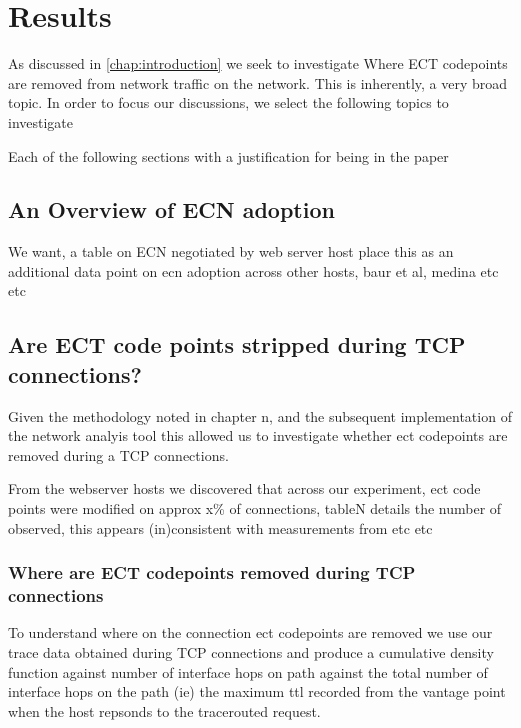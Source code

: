 \documentclass{l4proj}
\begin{document}
\chapter{Results} 

As discussed in \autoref{chap:introduction} we seek to investigate Where ECT codepoints are removed from network traffic on the network. This is inherently, a very broad topic. In order to focus our discussions, we select the following topics to investigate

{{Each of the following sections with a justification for being in the paper}}

\section{An Overview of ECN adoption}

We want, a table on ECN negotiated by web server host
place this as an additional data point on ecn adoption across other hosts, baur et al, medina etc etc


\section{Are ECT code points stripped during TCP connections?}

Given the methodology noted in chapter n, and the subsequent implementation of the network analyis tool this allowed us to investigate whether ect codepoints are removed during a TCP connections.

From the webserver hosts we discovered that across our experiment, ect code points were modified on approx x\% of connections, tableN details the number of observed, this appears (in)consistent with measurements  from etc etc

\subsection{Where are ECT codepoints removed during TCP connections}

To understand where on the connection ect codepoints are removed we use our trace data obtained during TCP connections and produce a cumulative density function against number of interface hops on path against the total number of interface hops on the path (ie) the maximum ttl recorded from the vantage point when the host repsonds to the tracerouted request.
\end{document}
